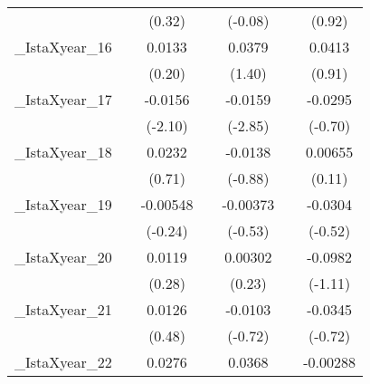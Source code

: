 {\begin{tabular}{l*{6}{c}}
            &                     &      (0.32)         &                     &     (-0.08)         &                     &      (0.92)         \\
[1em]
\_IstaXyear\_16&                     &      0.0133         &                     &      0.0379         &                     &      0.0413         \\
            &                     &      (0.20)         &                     &      (1.40)         &                     &      (0.91)         \\
[1em]
\_IstaXyear\_17&                     &     -0.0156\sym{*}  &                     &     -0.0159\sym{**} &                     &     -0.0295         \\
            &                     &     (-2.10)         &                     &     (-2.85)         &                     &     (-0.70)         \\
[1em]
\_IstaXyear\_18&                     &      0.0232         &                     &     -0.0138         &                     &     0.00655         \\
            &                     &      (0.71)         &                     &     (-0.88)         &                     &      (0.11)         \\
[1em]
\_IstaXyear\_19&                     &    -0.00548         &                     &    -0.00373         &                     &     -0.0304         \\
            &                     &     (-0.24)         &                     &     (-0.53)         &                     &     (-0.52)         \\
[1em]
\_IstaXyear\_20&                     &      0.0119         &                     &     0.00302         &                     &     -0.0982         \\
            &                     &      (0.28)         &                     &      (0.23)         &                     &     (-1.11)         \\
[1em]
\_IstaXyear\_21&                     &      0.0126         &                     &     -0.0103         &                     &     -0.0345         \\
            &                     &      (0.48)         &                     &     (-0.72)         &                     &     (-0.72)         \\
[1em]
\_IstaXyear\_22&                     &      0.0276         &                     &      0.0368         &                     &    -0.00288         \\

\end{tabular}}
